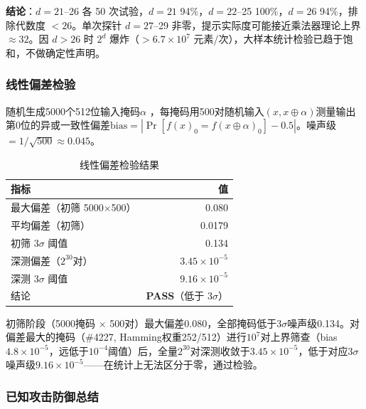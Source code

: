 \documentclass[11pt,a4paper]{ctexart}
\begin{document}
\textbf{结论}：$d=21$--26 各 50 次试验，$d=21$ 94\%，$d=22$--25 100\%，$d=26$ 94\%，排除代数度 $<26$。单次探针 $d=27$--29 非零，提示实际度可能接近乘法器理论上界 $\approx 32$。因 $d>26$ 时 $2^d$ 爆炸（$>6.7\times10^7$ 元素/次），大样本统计检验已趋于饱和，不做确定性声明。

\subsubsection{线性偏差检验}

随机生成5000个512位输入掩码$\alpha$ \cite{matsui}，每掩码用500对随机输入$(x, x\oplus\alpha)$测量输出第0位的异或一致性偏差$\mathrm{bias} = |\Pr[f(x)_0 = f(x\oplus\alpha)_0] - 0.5|$。噪声级$= 1/\sqrt{500} \approx 0.045$。

\begin{table}[H]
\centering
\begin{tabular}{@{}lr@{}}
\toprule
\textbf{指标} & \textbf{值} \\
\midrule
最大偏差（初筛 5000$\times$500） & 0.080 \\
平均偏差（初筛）           & 0.0179 \\
初筛 $3\sigma$ 阈值         & 0.134 \\
深测偏差（$2^{30}$对）     & \textbf{$3.45\times10^{-5}$} \\
深测 $3\sigma$ 阈值         & $9.16\times10^{-5}$ \\
结论                       & \textbf{PASS}（低于 $3\sigma$）\\
\bottomrule
\end{tabular}
\caption{线性偏差检验结果}
\label{tab:linear}
\end{table}

初筛阶段（5000掩码 $\times$ 500对）最大偏差0.080，全部掩码低于$3\sigma$噪声级0.134。对偏差最大的掩码（\#4227, Hamming权重252/512）进行$10^7$对上界筛查（bias $4.8\times10^{-5}$，远低于$10^{-4}$阈值）后，全量$2^{30}$对深测收敛于$3.45\times10^{-5}$，低于对应$3\sigma$噪声级$9.16\times10^{-5}$——在统计上无法区分于零，通过检验。

\subsubsection{已知攻击防御总结}
\end{document}
